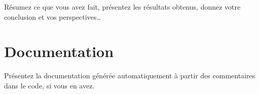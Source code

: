 \documentclass[11pt,a4paper]{article}
\begin{document}
Résumez ce que vous avez fait, présentez les résultats obtenus, donnez votre conclusion et vos perspectives\dots

% 
% 

\appendix

\appendixpage
\addappheadtotoc

\section{Documentation}

Présentez la documentation générée automatiquement à partir des commentaires dans le code, si vous en avez.
\end{document}
